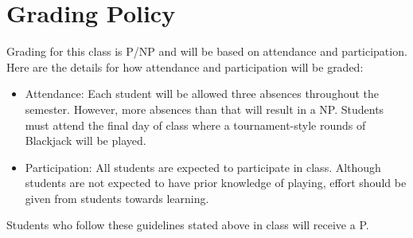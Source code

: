 \documentclass{article}
\begin{document}
\section{Grading Policy}
Grading for this class is P/NP and will be based on attendance and participation. Here are the details for how attendance and participation will be graded:
\newline
\begin{itemize}
	\item Attendance: Each student will be allowed three absences throughout the semester. However, more absences than that will result in a NP. Students must attend the final day of class where a tournament-style rounds of Blackjack will be played.
    \item Participation: All students are expected to participate in class. Although students are not expected to have prior knowledge of playing, effort should be given from students towards learning. 
\end{itemize}
Students who follow these guidelines stated above in class will receive a P.  
  
\end{document}
